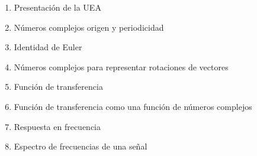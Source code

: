 \begin{enumerate}
  \item Presentación de la UEA
  \item Números complejos origen y periodicidad
  \item Identidad de Euler
  \item Números complejos para representar rotaciones de vectores
  \item Función de transferencia
  \item Función de transferencia como una función de números complejos
  \item Respuesta en frecuencia
  \item Espectro de frecuencias de una señal
\end{enumerate}